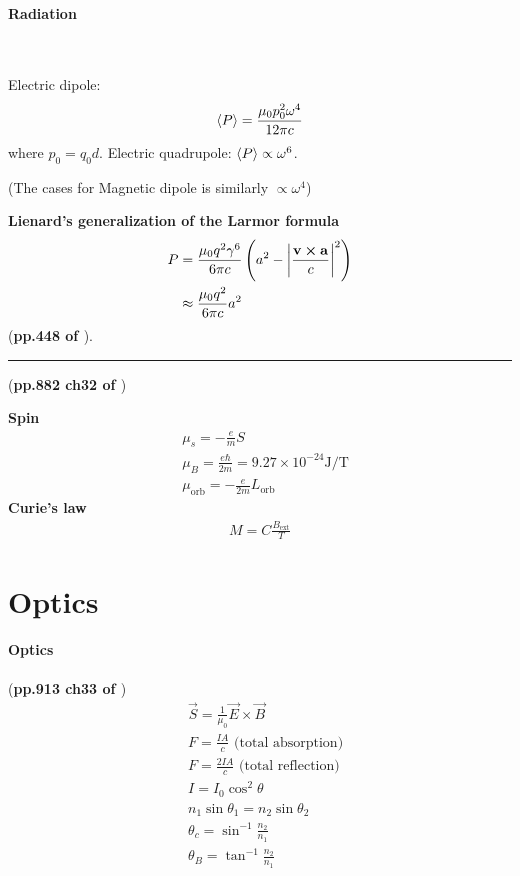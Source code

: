 \documentclass{article}
\numberwithin{equation}{subsection} %
\theoremstyle{definition}
\begin{document}
\paragraph{Radiation} $ $

Electric dipole:
\begin{equation}
    \braket{P} = \frac{\mu_0 p_0^2 \omega^4}{12\pi c}
\end{equation}
where $p_0 = q_0 d$.
Electric quadrupole: $\braket{P} \propto \omega^6$.

(The cases for Magnetic dipole is similarly $\propto \omega^4$)

\textbf{Lienard's generalization of the Larmor formula}
\begin{align}
    P &= \frac{\mu_0 q^2 \gamma^6}{6\pi c}
    \left( a^2- \abs{\frac{\vb{v}\cross\vb{a}}{c}}^2\right) \\
    &\approx \frac{\mu_0q^2}{6\pi c} a^2
\end{align}
(\textbf{pp.448 of \cite{Griffiths_electrod}}).

\begin{center}\noindent\rule{8cm}{0.4pt}\end{center}

(\textbf{pp.882 ch32 of \cite{book}})

\textbf{Spin}
\begin{align}
    & \mu_s = -\frac{e}{m} S \\
    & \mu_B = \frac{e\hbar}{2m} = 9.27\times 10^{-24} \text{J/T} \\
    & \mu_\text{orb} = -\frac{e}{2m} L_\text{orb}
\end{align}
\textbf{Curie's law} 
\begin{align}
    M = C\frac{B_\text{ext}}{T}
\end{align}

\section{Optics}
\label{sec:Optics}

\paragraph{Optics} (\textbf{pp.913 ch33 of \cite{book}})
\begin{align}
    & \vec{S} = \frac{1}{\mu_0} \vec{E}\times\vec{B} \\
    & F = \frac{IA}{c} \text{ (total absorption)} \\
    & F = \frac{2IA}{c} \text{ (total reflection)} \\
    & I = I_0 \cos^2{\theta} \\
    & n_1 \sin{\theta_1} = n_2 \sin{\theta_2} \\
    & \theta_c = \sin^{-1}\frac{n_2}{n_1} \\
    & \theta_B = \tan^{-1}\frac{n_2}{n_1}
\end{align}
\end{document}
